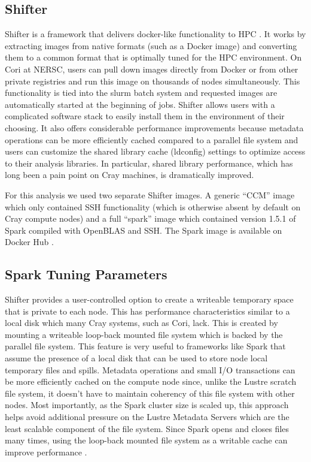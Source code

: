 \subsection{Shifter} \label{shiftersec}
Shifter is a framework that delivers docker-like functionality to HPC \cite{shifter}. It works by extracting images from native formats (such as a Docker image) and converting them to a common format that is optimally tuned for the HPC environment. On Cori at NERSC, users can pull down images directly from Docker or from other private registries and run this image on thousands of nodes simultaneously. This functionality is tied into the slurm batch system and requested images are automatically started at the beginning of jobs. Shifter allows users with a complicated software stack to easily install them in the environment of their choosing. It also offers considerable performance improvements because metadata operations can be more efficiently cached compared to a parallel file system and users can customize the shared library cache (ldconfig) settings to optimize access to their analysis libraries. In particular, shared library performance, which has long been a pain point on Cray machines, is dramatically improved.

For this analysis we used two separate Shifter images. A generic “CCM” image which only contained SSH functionality (which is otherwise absent by default on Cray compute nodes) and a full “spark” image which contained version 1.5.1 of Spark  compiled with OpenBLAS \cite{openblas} and SSH. The Spark image is available on Docker Hub \cite{dockerspark}. 

\subsection{Spark Tuning Parameters}

Shifter provides a user-controlled option to create a writeable temporary space that is private to each node. This has performance characteristics similar to a local disk which many Cray systems, such as Cori, lack. This is created by mounting a writeable loop-back mounted file system which is backed by the parallel file system. This feature is very useful to frameworks like Spark that assume the presence of a local disk that can be used to store node local temporary files and spills. Metadata operations and small I/O transactions can  be more efficiently cached on the compute node since, unlike the Lustre scratch file system, it doesn't have to maintain coherency of this file system with other nodes. Most importantly, as the Spark cluster size is scaled up, this approach helps avoid additional pressure on the Lustre Metadata Servers which are the least scalable component of the file system. Since Spark opens and closes files many times, using the loop-back mounted file system as a writable cache can improve performance \cite{scalingspark16}.

